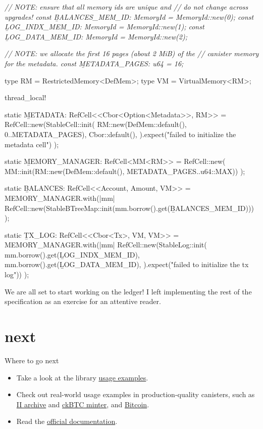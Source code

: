 \documentclass{article}
\begin{document}
\begin{code}[rust]
\em{// NOTE: ensure that all memory ids are unique and}
\em{// do not change across upgrades!}
const \b{BALANCES_MEM_ID}: MemoryId = MemoryId::new(0);
const \b{LOG_INDX_MEM_ID}: MemoryId = MemoryId::new(1);
const \b{LOG_DATA_MEM_ID}: MemoryId = MemoryId::new(2);

\em{// NOTE: we allocate the first 16 pages (about 2 MiB) of the}
\em{// canister memory for the metadata.}
const \b{METADATA_PAGES}: u64 = 16;

type RM = RestrictedMemory<DefMem>;
type VM = VirtualMemory<RM>;

thread_local! {
  static \b{METADATA}: RefCell<\href{#stable-cell}{}<Cbor<Option<Metadata>>, RM>> =
    RefCell::new(StableCell::init(
        RM::new(DefMem::default(), 0..METADATA_PAGES),
        Cbor::default(),
      ).expect("failed to initialize the metadata cell")
    );

  static \b{MEMORY_MANAGER}: RefCell<MM<RM>> = RefCell::new(
    MM::init(RM::new(DefMem::default(), METADATA_PAGES..u64::MAX))
  );

  static \b{BALANCES}: RefCell<\href{#stable-btree}{}<Account, Amount, VM>> =
    MEMORY_MANAGER.with(|mm| {
      RefCell::new(StableBTreeMap::init(mm.borrow().get(\b{BALANCES_MEM_ID})))
    });

  static \b{TX_LOG}: RefCell<\href{#stable-log}{}<Cbor<Tx>, VM, VM>> =
    MEMORY_MANAGER.with(|mm| {
      RefCell::new(StableLog::init(
        mm.borrow().get(\b{LOG_INDX_MEM_ID}),
        mm.borrow().get(\b{LOG_DATA_MEM_ID}),
      ).expect("failed to initialize the tx log"))
    });
}
\end{code}

We are all set to start working on the ledger!
I left implementing the rest of the specification as an exercise for an attentive reader.

\section{next}{Where to go next}
\begin{itemize}
  \item Take a look at the library \href{https://github.com/dfinity/stable-structures/tree/main/examples/src}{usage examples}.
  \item Check out real-world usage examples in production-quality canisters, such as \href{https://github.com/dfinity/internet-identity/blob/97e8d968aba653c8857537ecd541b35de5085608/src/archive/src/main.rs}{II archive} and \href{https://github.com/dfinity/ic/blob/df57b720fd0ceed70f021f4812c797fb40d97503/rs/bitcoin/ckbtc/minter/src/storage.rs}{ckBTC minter}, and \href{https://github.com/dfinity/bitcoin-canister/blob/9242d5f9a784ac115c2042fd09705dd9321ff7b7/canister/src/block_header_store.rs#L13}{Bitcoin}.
  \item Read the \href{https://docs.rs/ic-stable-structures/latest/ic_stable_structures/}{official documentation}.
\end{itemize}
\end{document}
